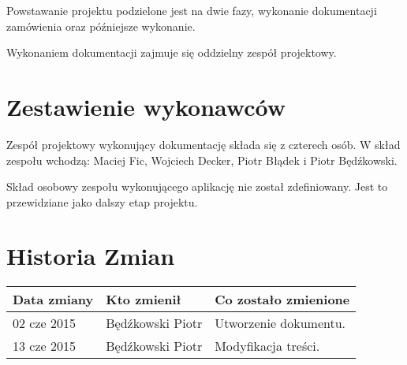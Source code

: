 Powstawanie projektu podzielone jest na dwie fazy, wykonanie dokumentacji zamówienia oraz późniejsze wykonanie.

\bigskip
\noindent Wykonaniem dokumentacji zajmuje się oddzielny zespół projektowy.

\section{Zestawienie wykonawców}

Zespół projektowy wykonujący dokumentację składa się z czterech osób. W skład zespołu wchodzą: Maciej Fic, Wojciech Decker, Piotr Błądek i Piotr Będźkowski.

\bigskip
\noindent Skład osobowy zespołu wykonującego aplikację nie został zdefiniowany. Jest to przewidziane jako dalszy etap projektu.

\section{Historia Zmian}

\begin{tabularx}{\textwidth}{X|l|X}
\hline
\textbf{Data zmiany} & \textbf{Kto zmienił} & \textbf{Co zostało zmienione} \\ \hline
02 cze 2015          & Będźkowski Piotr     & Utworzenie dokumentu.           \\ \hline
13 cze 2015          & Będźkowski Piotr     & Modyfikacja treści.           \\ \hline
\end{tabularx}
